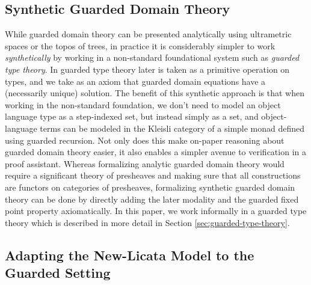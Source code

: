 \subsection{Synthetic Guarded Domain Theory}

While guarded domain theory can be presented analytically using
ultrametric spaces or the topos of trees, in practice it is
considerably simpler to work \emph{synthetically} by working in a
non-standard foundational system such as \emph{guarded type
theory}. In guarded type theory later is taken as a primitive
operation on types, and we take as an axiom that guarded domain
equations have a (necessarily unique) solution. The benefit of this
synthetic approach is that when working in the non-standard
foundation, we don't need to model an object language type as a
step-indexed set, but instead simply as a set, and object-language
terms can be modeled in the Kleisli category of a simple monad defined
using guarded recursion. Not only does this make on-paper reasoning
about guarded domain theory easier, it also enables a simpler avenue
to verification in a proof assistant. Whereas formalizing analytic
guarded domain theory would require a significant theory of presheaves
and making sure that all constructions are functors on categories of
presheaves, formalizing synthetic guarded domain theory can be done by
directly adding the later modality and the guarded fixed point
property axiomatically.
%
%
In this paper, we work informally in a guarded type theory which is described in
more detail in Section \ref{sec:guarded-type-theory}.
%



\subsection{Adapting the New-Licata Model to the Guarded Setting}


